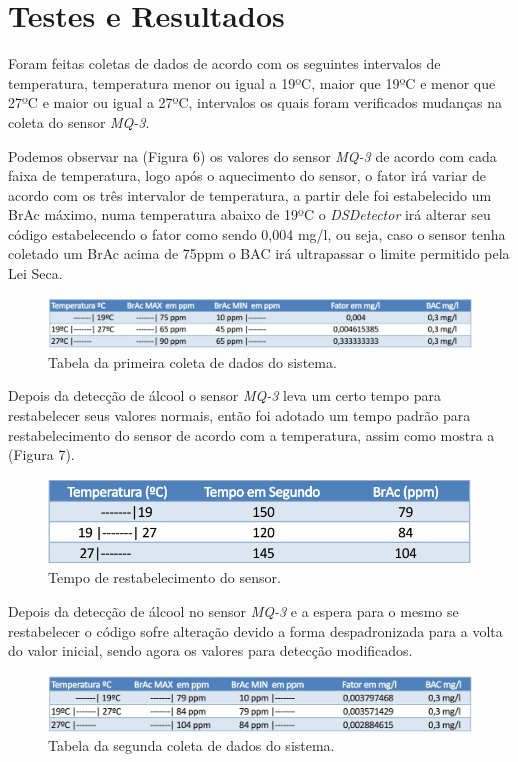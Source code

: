 \documentclass[12pt]{article}
\begin{document}
\section{Testes e Resultados}

Foram feitas coletas de dados de acordo com os seguintes
intervalos de temperatura, temperatura menor ou igual a
19ºC, maior que 19ºC e menor que 27ºC e maior ou igual a
27ºC, intervalos os quais foram verificados mudanças na coleta
do sensor \emph{MQ-3}.


Podemos observar na (Figura 6) os valores do sensor \emph{MQ-3} de acordo com cada faixa de temperatura, logo após o aquecimento do sensor, o fator irá variar de acordo com os três intervalor de temperatura, a partir dele foi estabelecido um BrAc máximo, numa temperatura abaixo de 19ºC o \emph{DSDetector} irá alterar seu código estabelecendo o fator como sendo 0,004 mg/l, ou seja, caso o sensor tenha coletado um BrAc acima de 75ppm o BAC irá ultrapassar o limite permitido pela Lei Seca.
\begin{figure}[ht]
\centering
\includegraphics[width=.9\textwidth]{tabela1.jpg}
\caption{Tabela da primeira coleta de dados do sistema.}
\label{fig:exampleFig1}
\end{figure}

Depois da detecção de álcool o sensor \emph{MQ-3} leva um certo
tempo para restabelecer seus valores normais, então foi adotado um tempo padrão para restabelecimento do sensor de acordo com a temperatura, assim como mostra a (Figura 7).


\begin{figure}[ht]
\centering
\includegraphics[width=.6\textwidth]{tabela2.jpg}
\caption{Tempo de restabelecimento do sensor.}
\label{fig:exampleFig1}
\end{figure}

Depois da detecção de álcool no sensor \emph{MQ-3} e a espera para
o mesmo se restabelecer o código sofre alteração devido a
forma despadronizada para a volta do valor inicial, sendo agora
os valores para detecção modificados.

\begin{figure}[ht]
\centering
\includegraphics[width=.9\textwidth]{tabela3.jpg}
\caption{Tabela da segunda coleta de dados do sistema.}
\label{fig:exampleFig1}
\end{figure}
\end{document}
